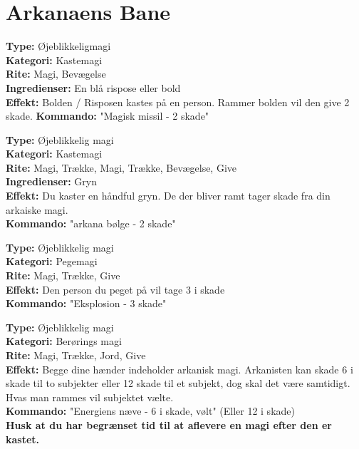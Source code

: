 \section{Arkanaens Bane}
\begin{arkBaneMagi*}
\textbf{Type:} Øjeblikkeligmagi\\
\textbf{Kategori:} Kastemagi\\
\textbf{Rite:} Magi, Bevægelse\\
\textbf{Ingredienser:} En blå rispose eller bold \\
\textbf{Effekt:} Bolden / Risposen kastes på en person. Rammer bolden vil den give 2 skade.
\textbf{Kommando:} "Magisk missil - 2 skade"
\end{arkBaneMagi*}

\begin{arkBaneMagi*}
\textbf{Type:} Øjeblikkelig magi\\
\textbf{Kategori:} Kastemagi\\
\textbf{Rite:} Magi, Trække, Magi, Trække, Bevægelse, Give\\
\textbf{Ingredienser:} Gryn\\
\textbf{Effekt:} Du kaster en håndful gryn. De der bliver ramt tager skade fra din arkaiske magi.\\
\textbf{Kommando:} "arkana bølge - 2 skade"
\end{arkBaneMagi*}

\begin{arkBaneMagi*}[Eksplosion]
\textbf{Type:} Øjeblikkelig magi\\
\textbf{Kategori:} Pegemagi\\
\textbf{Rite:} Magi, Trække, Give\\
\textbf{Effekt:} Den person du peget på vil tage 3 i skade\\
\textbf{Kommando:} "Eksplosion - 3 skade"
\end{arkBaneMagi*}

\begin{arkBaneMagi*}
\textbf{Type:} Øjeblikkelig magi\\
\textbf{Kategori:} Berørings magi\\
\textbf{Rite:} Magi, Trække, Jord, Give\\
\textbf{Effekt:} Begge dine hænder indeholder arkanisk magi. Arkanisten kan skade 6 i skade til to subjekter eller 12 skade til et subjekt, dog skal det være samtidigt. Hvas man rammes vil subjektet vælte.\\
\textbf{Kommando:} "Energiens næve - 6 i skade, vølt" (Eller 12 i skade)\\
\textbf{Husk at du har begrænset tid til at aflevere en magi efter den er kastet.}
\end{arkBaneMagi*}

